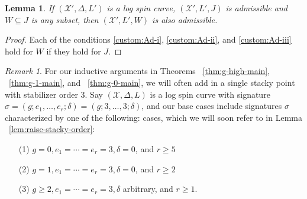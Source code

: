 \documentclass{amsart}
\makeatletter
\theoremstyle{plain}
\newtheorem{lem}[thm]{Lemma}
\theoremstyle{definition}
\theoremstyle{remark}
\newtheorem{rem}[thm]{Remark}
\numberwithin{equation}{section}
\newcommand\sx{\mathscr X}
\newcommand{\halfcan}{L}
\newcommand{\customlabel}[2]{%
   \protected@write \@auxout {}{\string \newlabel {#1}{{#2}{\thepage}{#2}{#1}{}} }%
   \hypertarget{#1}{#2}
}
\makeatother
\begin{document}
\begin{lem}
\label{lem:admissible_subset}
If $(\sx', \Delta, \halfcan')$ is a log spin curve, $(\sx', \halfcan', J)$ is admissible and $W \subseteq J$ is any subset,
then $(\sx', L', W)$ is also admissible.
\end{lem}

\begin{proof}
Each of the conditions \ref{custom:Ad-i}, \ref{custom:Ad-ii}, and \ref{custom:Ad-iii} hold for $W$
if they hold for $J$.
\end{proof}

\begin{rem}
\label{rem:three-cases}
For our inductive arguments in Theorems ~\ref{thm:g-high-main},
~\ref{thm:g-1-main}, and ~\ref{thm:g-0-main}, we will often add in a
single stacky point with stabilizer order $3$. Say $(\sx, \Delta,
\halfcan)$ is a log spin curve with signature $\sigma = (g; e_1,
\ldots, e_r; \delta) = (g; 3, \ldots, 3; \delta)$, and our base cases
include signatures $\sigma$ characterized by one of the following:
cases, which we will soon refer to in Lemma
~\ref{lem:raise-stacky-order}:

\begin{enumerate}
	\item[\customlabel{custom:three-cases-1}{(1)}] $g = 0, e_1 =
		\cdots = e_r = 3, \delta = 0$, and $r \geq 5$
	\item[\customlabel{custom:three-cases-2}{(2)}] $g = 1, e_1 =
		\cdots = e_r = 3, \delta = 0$, and $ r \geq 2$
	\item[\customlabel{custom:three-cases-3}{(3)}] $g \geq 2, e_1 =
		\cdots = e_r = 3, \delta$ arbitrary, and $r \geq 1$.
\end{enumerate}
\end{rem}
\end{document}
